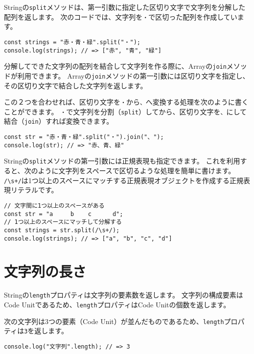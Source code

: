 Stringの\texttt{split}メソッドは、第一引数に指定した区切り文字で文字列を分解した配列を返します。
次のコードでは、文字列を\texttt{・}で区切った配列を作成しています。

\begin{lstlisting}
const strings = "赤・青・緑".split("・");
console.log(strings); // => ["赤", "青", "緑"]
\end{lstlisting}

分解してできた文字列の配列を結合して文字列を作る際に、Arrayの\texttt{join}メソッドが利用できます。
Arrayの\texttt{join}メソッドの第一引数には区切り文字を指定し、その区切り文字で結合した文字列を返します。

この２つを合わせれば、区切り文字を\texttt{・}から\texttt{、}へ変換する処理を次のように書くことができます。
\texttt{・}で文字列を分割（\texttt{split}）してから、区切り文字を\texttt{、}にして結合（\texttt{join}）すれば変換できます。

\begin{lstlisting}
const str = "赤・青・緑".split("・").join("、");
console.log(str); // => "赤、青、緑"
\end{lstlisting}

Stringの\texttt{split}メソッドの第一引数には正規表現も指定できます。
これを利用すると、次のように文字列をスペースで区切るような処理を簡単に書けます。
\texttt{/\textbackslash s+/}は1つ以上のスペースにマッチする正規表現オブジェクトを作成する正規表現リテラルです。

\begin{lstlisting}
// 文字間に1つ以上のスペースがある
const str = "a     b    c      d";
// 1つ以上のスペースにマッチして分解する
const strings = str.split(/\s+/);
console.log(strings); // => ["a", "b", "c", "d"]
\end{lstlisting}

\hypertarget{length}{%
\section{文字列の長さ}\label{length}}

Stringの\texttt{length}プロパティは文字列の要素数を返します。
文字列の構成要素はCode
Unitであるため、\texttt{length}プロパティはCode
Unitの個数を返します。

次の文字列は3つの要素（Code
Unit）が並んだものであるため、\texttt{length}プロパティは\texttt{3}を返します。

\begin{lstlisting}
console.log("文字列".length); // => 3
\end{lstlisting}

